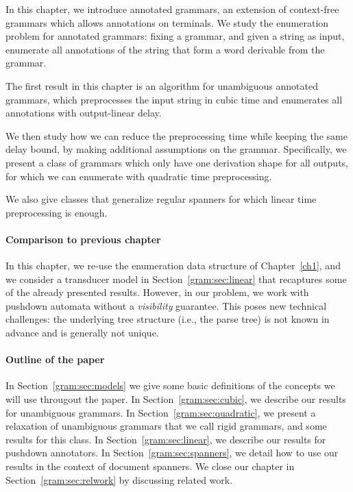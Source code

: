 In this chapter, we introduce annotated grammars, an extension of context-free grammars which allows annotations on terminals. We study the enumeration problem for annotated grammars: fixing a grammar, and given a string as input, enumerate all annotations of the string that form a word derivable from the grammar. 

The first result in this chapter is an algorithm for unambiguous annotated grammars, which preprocesses the input string in cubic time and enumerates all annotations with output-linear delay. 

We then study how we can reduce the preprocessing time while keeping the same delay bound, by making additional assumptions on the grammar. Specifically, we present a class of grammars which only have one derivation shape for all outputs, for which we can enumerate with quadratic time preprocessing. 

We also give classes that generalize regular spanners for which linear time preprocessing is enough.

%

\paragraph{Comparison to previous chapter}
In this chapter, we re-use the
enumeration data structure of Chapter~\ref{ch1}, and we consider a transducer model in
Section~\ref{gram:sec:linear} that recaptures some of the already presented results. 
However, in our
problem, we work with pushdown automata without a {\em visibility} guarantee. This poses new technical
challenges: the underlying tree structure (i.e., the parse tree) is not known in
advance and is generally not unique.

\paragraph{Outline of the paper}
In Section~\ref{gram:sec:models} we give some basic definitions of the concepts we will use througout the paper. In Section~\ref{gram:sec:cubic}, we describe our results for unambiguous grammars. In Section~\ref{gram:sec:quadratic}, we present a relaxation of unambiguous grammars that we call rigid grammars, and some results for this class. In Section~\ref{gram:sec:linear}, we describe our results for pushdown annotators. In Section~\ref{gram:sec:spanners}, we detail how to use our results in the context of document spanners. We close our chapter in Section~\ref{gram:sec:relwork} by discussing related work.

